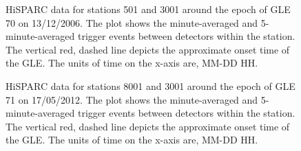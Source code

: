 \begin{figure}[ht!]
	\centering
	
	\caption{HiSPARC data for stations 501 and 3001 around the epoch of GLE 70 on 13/12/2006. The plot shows the minute-averaged and 5-minute-averaged trigger events between detectors within the station. The vertical red, dashed line depicts the approximate onset time of the GLE. The units of time on the x-axis are, MM-DD HH.}
	\label{fig:GLE_70}
\end{figure}

\begin{figure}[ht!]
	\centering
	
	\caption{HiSPARC data for stations 8001 and 3001 around the epoch of GLE 71 on 17/05/2012. The plot shows the minute-averaged and 5-minute-averaged trigger events between detectors within the station. The vertical red, dashed line depicts the approximate onset time of the GLE. The units of time on the x-axis are, MM-DD HH.}
	\label{fig:GLE_71}
\end{figure}

